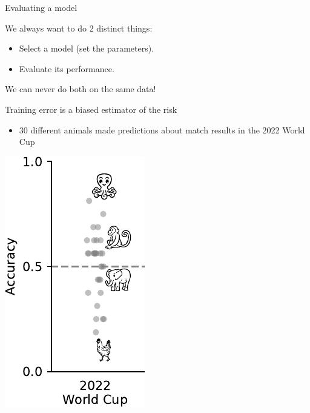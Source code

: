 \documentclass[presentation,mathserif,table]{beamer}
\begin{document}
\begin{frame}[label={sec:orgb64269e}]{Evaluating a model}
\begin{block}{We always want to do 2 distinct things:}
\begin{itemize}
\item Select a model (set the parameters).
\item Evaluate its performance.
\end{itemize}

\vfill
\end{block}

\begin{structureenv} %
We can never do both on the same data!
\end{structureenv}
\end{frame}
\begin{frame}[label={sec:org3b41f14}]{Training error is a biased estimator of the risk}
\begin{itemize}
\item 30 different animals made predictions about match results in the 2022 World Cup
\end{itemize}
\begin{center}
\includegraphics[height=.65 \textheight]{figures/generated/select_evaluate/select_evaluate_1.pdf}
\end{center}
\end{frame}
\end{document}
